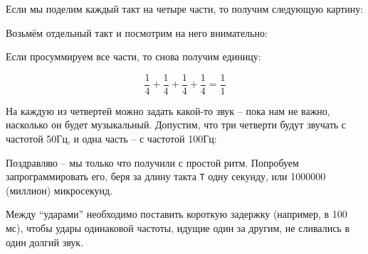 \documentclass[a4paper,twoside]{book}
\begin{document}
Если мы поделим каждый такт на четыре части, то получим следующую картину:


Возьмём отдельный такт и посмотрим на него внимательно:


Если просуммируем все части, то снова получим единицу:

\begin{equation}
  \frac{1}{4} + \frac{1}{4} + \frac{1}{4} + \frac{1}{4} = \frac{1}{1}
\end{equation}

На каждую из четвертей можно задать какой-то звук -- пока нам не важно, насколько
он будет музыкальный. Допустим, что три четверти будут звучать с частотой 50Гц,
и одна часть -- с частотой 100Гц:


Поздравляю -- мы только что получили с простой ритм. Попробуем запрограммировать
его, беря за длину такта \texttt{T} одну секунду, или 1000000 (миллион)
микросекунд.

Между ``ударами'' необходимо поставить короткую задержку (например, в 100 мс),
чтобы удары одинаковой частоты, идущие один за другим, не сливались в один
долгий звук.
\end{document}
